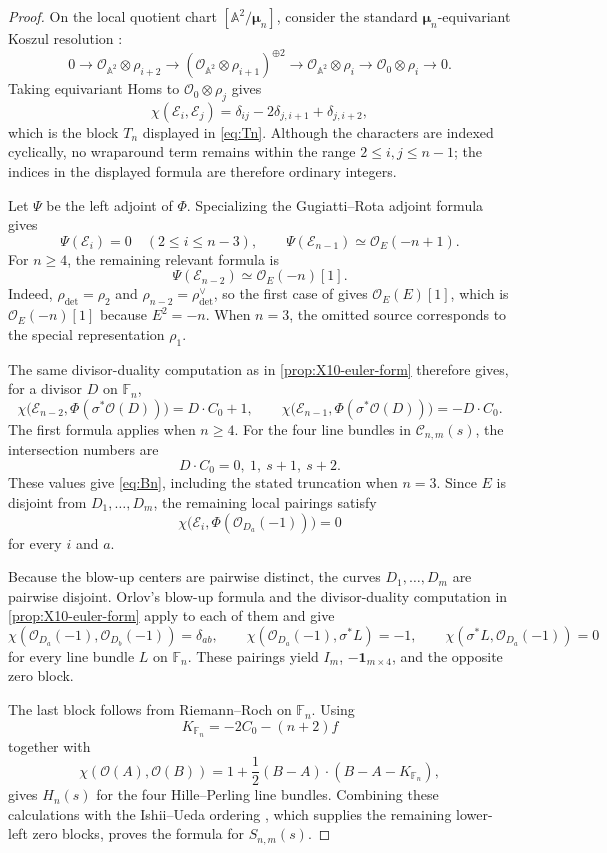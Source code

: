 \documentclass[11pt]{article}
\theoremstyle{plain}
\theoremstyle{definition}
\theoremstyle{remark}
\newcommand{\A}{\mathbb A}
\newcommand{\F}{\mathbb F}
\newcommand{\OO}{\mathcal O}
\begin{document}
\begin{proof}
On the local quotient chart \([\A^2/\boldsymbol{\mu}_n]\), consider the
standard \(\boldsymbol{\mu}_n\)-equivariant Koszul resolution
\cite[cf. Proposition~3.10]{Ishii2015}:
\[
0\longrightarrow
\OO_{\A^2}\otimes\rho_{i+2}
\longrightarrow
(\OO_{\A^2}\otimes\rho_{i+1})^{\oplus2}
\longrightarrow
\OO_{\A^2}\otimes\rho_i
\longrightarrow
\OO_0\otimes\rho_i
\longrightarrow0.
\]
Taking equivariant Homs to \(\OO_0\otimes\rho_j\) gives
\[
\chi(\mathcal E_i,\mathcal E_j)
=
\delta_{ij}-2\delta_{j,i+1}+\delta_{j,i+2},
\]
which is the block \(T_n\) displayed in \eqref{eq:Tn}. Although the characters are indexed cyclically, no
wraparound term remains within the range \(2\leq i,j\leq n-1\); the indices
in the displayed formula are therefore ordinary integers.

Let \(\Psi\) be the left adjoint of \(\Phi\). Specializing the Gugiatti--Rota
adjoint formula \cite[Theorem~3.1 and Example~3.5]{GugiattiRota2023} gives
\[
\Psi(\mathcal E_i)=0
\quad(2\leq i\leq n-3),
\qquad
\Psi(\mathcal E_{n-1})\simeq\OO_E(-n+1).
\]
For \(n\geq4\), the remaining relevant formula is
\[
\Psi(\mathcal E_{n-2})\simeq\OO_E(-n)[1].
\]
Indeed, \(\rho_{\det}=\rho_2\) and
\(\rho_{n-2}=\rho_{\det}^{\vee}\), so the first case of
\cite[Theorem~3.1]{GugiattiRota2023} gives \(\OO_E(E)[1]\),
which is \(\OO_E(-n)[1]\) because \(E^2=-n\).
When \(n=3\), the omitted source corresponds to the special representation
\(\rho_1\).

The same divisor-duality computation as in
\cref{prop:X10-euler-form} therefore gives, for a divisor \(D\) on \(\F_n\),
\[
\chi\bigl(\mathcal E_{n-2},\Phi(\sigma^*\OO(D))\bigr)
=D\cdot C_0+1,
\qquad
\chi\bigl(\mathcal E_{n-1},\Phi(\sigma^*\OO(D))\bigr)
=-D\cdot C_0.
\]
The first formula applies when \(n\geq4\). For the four line bundles in
\(\mathcal C_{n,m}(s)\), the intersection numbers are
\[
D\cdot C_0=0,\ 1,\ s+1,\ s+2.
\]
These values give \eqref{eq:Bn}, including the stated truncation when \(n=3\).
Since \(E\) is disjoint from \(D_1,\dots,D_m\), the remaining local pairings
satisfy
\[
\chi\bigl(\mathcal E_i,\Phi(\OO_{D_a}(-1))\bigr)=0
\]
for every \(i\) and \(a\).

Because the blow-up centers are pairwise distinct, the curves
\(D_1,\dots,D_m\) are pairwise disjoint. Orlov's blow-up formula
\cite[Theorem~4.3 and Corollary~4.4]{Orlov1993} and the divisor-duality
computation in \cref{prop:X10-euler-form} apply to each of them and give
\[
\chi(\OO_{D_a}(-1),\OO_{D_b}(-1))=\delta_{ab},
\qquad
\chi(\OO_{D_a}(-1),\sigma^*L)=-1,
\qquad
\chi(\sigma^*L,\OO_{D_a}(-1))=0
\]
for every line bundle \(L\) on \(\F_n\). These pairings yield \(I_m\),
\(-\mathbf1_{m\times4}\), and the opposite zero block.

The last block follows from Riemann--Roch on \(\F_n\). Using
\[
K_{\F_n}=-2C_0-(n+2)f
\]
together with
\[
\chi(\OO(A),\OO(B))
=
1+\frac12(B-A)\cdot(B-A-K_{\F_n}),
\]
gives \(H_n(s)\) for the four Hille--Perling line bundles. Combining these
calculations with the Ishii--Ueda ordering
\cite[Theorem~1.4]{Ishii2015}, which supplies the remaining lower-left zero
blocks, proves the formula for \(S_{n,m}(s)\).
\end{proof}
\end{document}
